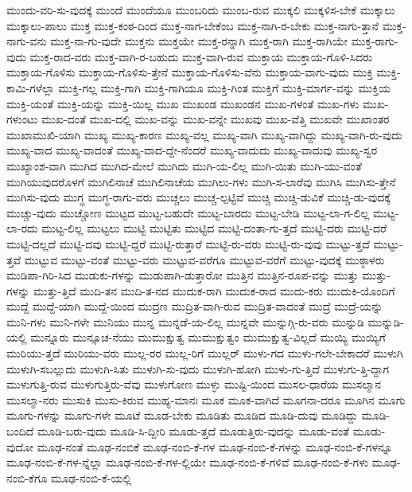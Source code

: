 {ಮುಂದು-ವರಿ-ಸು-ವುದಕ್ಕೆ
ಮುಂದೆ
ಮುಂದೆಯೂ
ಮುಂಬರಿದು
ಮುಂಬ-ರುವ
ಮುಕ್ಕಲಿ
ಮುಕ್ಕಳಿಸ-ಬೇಕೆ
ಮುಕ್ಕಾಲು
ಮುಕ್ಕಾಲು-ಪಾಲು
ಮುಕ್ತ
ಮುಕ್ತ-ಕಂಠ-ದಿಂದ
ಮುಕ್ತ-ನಾಗ-ಬೇಕೆಂಬ
ಮುಕ್ತ-ನಾಗಿ-ರ-ಬೇಕು
ಮುಕ್ತ-ನಾಗು-ತ್ತಾನೆ
ಮುಕ್ತ-ನಾಗು-ವನು
ಮುಕ್ತ-ನಾ-ಗು-ವುದೇ
ಮುಕ್ತನು
ಮುಕ್ತಯೇ
ಮುಕ್ತ-ರನ್ನಾಗಿ
ಮುಕ್ತ-ರಾಗಿ
ಮುಕ್ತ-ರಾಗಿಯೇ
ಮುಕ್ತ-ರಾಗು-ವುದು
ಮುಕ್ತ-ರಾದ-ವರು
ಮುಕ್ತ-ವಾಗಿ-ರ-ಬಹುದು
ಮುಕ್ತ-ವಾಗಿ-ರುವ
ಮುಕ್ತಾಯ
ಮುಕ್ತಾಯ-ಗೊಳಿ-ಸಿದರು
ಮುಕ್ತಾಯ-ಗೊಳಿಸು
ಮುಕ್ತಾಯ-ಗೊಳಿಸು-ತ್ತೇನೆ
ಮುಕ್ತಾಯ-ಗೊಳಿಸು-ವೆನು
ಮುಕ್ತಾಯ-ವಾಗು-ವುದು
ಮುಕ್ತಿ
ಮುಕ್ತಿ-ಕಾಮಿ-ಗಳೆಲ್ಲಾ
ಮುಕ್ತಿ-ಗಲ್ಲ
ಮುಕ್ತಿ-ಗಾಗಿ
ಮುಕ್ತಿ-ಗಾಗಿಯೂ
ಮುಕ್ತಿ-ಗಿಂತ
ಮುಕ್ತಿಗೆ
ಮುಕ್ತಿ-ಮಾರ್ಗ-ವನ್ನು
ಮುಕ್ತಿಯ
ಮುಕ್ತಿ-ಯಂತೆ
ಮುಕ್ತಿ-ಯನ್ನು
ಮುಕ್ತಿ-ಯಿಲ್ಲ
ಮುಖ
ಮುಖಂಡ
ಮುಖಂಡನ
ಮುಖ-ಗಳಂತೆ
ಮುಖ-ಗಳು
ಮುಖ-ಗಳುಂಟು
ಮುಖ-ದಂತೆ
ಮುಖ-ದಲ್ಲಿ
ಮುಖ-ವನ್ನು
ಮುಖ-ವನ್ನೇ
ಮುಖವು
ಮುಖ-ವೆತ್ತಿ
ಮುಖವೇ
ಮುಖಾಂತರ
ಮುಖಾಮುಖಿ-ಯಾಗಿ
ಮುಖ್ಯ
ಮುಖ್ಯ-ಕಾರಣ
ಮುಖ್ಯ-ವಲ್ಲ
ಮುಖ್ಯ-ವಾಗಿ
ಮುಖ್ಯ-ವಾಗಿದ್ದು
ಮುಖ್ಯ-ವಾಗಿ-ರು-ವುದು
ಮುಖ್ಯ-ವಾದ
ಮುಖ್ಯ-ವಾದಂತೆ
ಮುಖ್ಯ-ವಾದ-ದ್ದೇ-ನೆಂದರೆ
ಮುಖ್ಯ-ವಾದುದು
ಮುಖ್ಯ-ವಾದುವು
ಮುಖ್ಯ-ಸ್ವರ
ಮುಖ್ಯಾಂಶ-ವಾಗಿ
ಮುಗಿದ
ಮುಗಿದ-ಮೇಲೆ
ಮುಗಿದು
ಮುಗಿ-ಯ-ಲಿಲ್ಲ
ಮುಗಿ-ಯಿತು
ಮುಗಿ-ಯು-ವಂತೆ
ಮುಗಿಯುವುದರೊಳಗೆ
ಮುಗಿಲಿನಾಚೆ
ಮುಗಿಲಿನಾಚೆಯ
ಮುಗಿಲು-ಗಳು
ಮುಗಿ-ಸ-ಲಾರೆವು
ಮುಗಿಸಿ
ಮುಗಿಸು-ತ್ತೇನೆ
ಮುಗಿಸು-ವುದು
ಮುಗ್ಧ
ಮುಗ್ಧ-ರಾಗು-ವರು
ಮುಚ್ಚಲು
ಮುಚ್ಚ-ಲ್ಪಟ್ಟಿವೆ
ಮುಚ್ಚಿ
ಮುಚ್ಚಿ-ಡುವಿಕೆ
ಮುಚ್ಚಿ-ಡು-ವುದಕ್ಕೆ
ಮುಚ್ಚು-ವುದು
ಮುಚ್ಚೋಣ
ಮುಟ್ಟದ
ಮುಟ್ಟ-ಬಹುದೇ
ಮುಟ್ಟ-ಬಾರದು
ಮುಟ್ಟ-ಬೇಡಿ
ಮುಟ್ಟ-ಲಾ-ಗ-ಲಿಲ್ಲ
ಮುಟ್ಟ-ಲಾ-ರದು
ಮುಟ್ಟ-ಲಿಲ್ಲ
ಮುಟ್ಟಲು
ಮುಟ್ಟಿ
ಮುಟ್ಟಿತು
ಮುಟ್ಟಿದ
ಮುಟ್ಟಿ-ದಂತಾ-ಗು-ತ್ತದೆ
ಮುಟ್ಟಿ-ದರು
ಮುಟ್ಟಿ-ದರೆ
ಮುಟ್ಟಿ-ದಲ್ಲದೆ
ಮುಟ್ಟಿ-ದವು
ಮುಟ್ಟಿ-ದ್ದರೆ
ಮುಟ್ಟಿ-ರುತ್ತಾರೆ
ಮುಟ್ಟಿ-ರು-ವರು
ಮುಟ್ಟಿ-ರು-ವುವು
ಮುಟ್ಟು-ತ್ತದೆ
ಮುಟ್ಟು-ತ್ತವೆ
ಮುಟ್ಟುವ
ಮುಟ್ಟು-ವಂತೆ
ಮುಟ್ಟು-ವರು
ಮುಟ್ಟುವ-ವರೆಗೂ
ಮುಟ್ಟುವ-ವರೆಗೆ
ಮುಟ್ಟು-ವುದಕ್ಕೆ
ಮುಠ್ಠಾಳರು
ಮುಡಿಪಾ-ಗಿರಿ-ಸಿದ
ಮುಡುಕು-ಗಳನ್ನು
ಮುಡುಪಾಗಿ-ಡುತ್ತಾರೋ
ಮುತ್ತಿನ
ಮುತ್ತಿನ-ರೂಪ-ವನ್ನು
ಮುತ್ತು
ಮುತ್ತು-ಗಳನ್ನು
ಮುತ್ತು-ತ್ತಿದೆ
ಮುದಿ-ತನ
ಮುದಿ-ತ-ನದ
ಮುದುಕ-ರಾಗಿ
ಮುದುಕ-ರಾದ
ಮುದು-ಕರು
ಮುದುಕಿ-ಯೊಂದಿಗೆ
ಮುದ್ದೆ
ಮುದ್ದೆ-ಯಾಗಿ
ಮುದ್ದೆ-ಯಿಂದ
ಮುದ್ರಣ
ಮುದ್ರಿತ-ವಾಗಿ-ರುವ
ಮುದ್ರಿತ-ವಾದಂತೆ
ಮುದ್ರೆ
ಮುದ್ರೆ-ಯನ್ನು
ಮುನಿ-ಗಳು
ಮುನಿ-ಗಳೇ
ಮುನಿಯು
ಮುನ್ನ
ಮುನ್ನಡೆ-ಯ-ಲಿಲ್ಲ
ಮುನ್ನವೇ
ಮುನ್ನುಗ್ಗಿ-ರು-ವರು
ಮುನ್ನುಡಿ
ಮುನ್ನುಡಿ-ಯಲ್ಲಿ
ಮುನ್ನೂರು
ಮುನ್ಸೂಚ-ನೆಯು
ಮುಮುಕ್ಷುತ್ವ
ಮುಮುಕ್ಷುತ್ವಂ
ಮುಮುಕ್ಷುತ್ವ-ವಿಲ್ಲದೆ
ಮುಯ್ಯಿ
ಮುಯ್ಯಿಗೆ
ಮುರಿಯು-ತ್ತದೆ
ಮುರಿಯು-ವರು
ಮುಲ್ಲ-ರರ
ಮುಲ್ಲ-ರಿಗೆ
ಮುಲ್ಲರ್
ಮುಳು-ಗದ
ಮುಳು-ಗಲೇ-ಬೇಕಾದರೆ
ಮುಳುಗಿ
ಮುಳುಗಿ-ಸಬಲ್ಲುದು
ಮುಳುಗಿ-ಸಿತು
ಮುಳುಗಿ-ಸು-ವುದು
ಮುಳುಗಿ-ಹೋಗಿ
ಮುಳು-ಗು-ತ್ತಿದೆ
ಮುಳುಗು-ತ್ತಿ-ದ್ದಾಗ
ಮುಳುಗುತ್ತಿ-ರುವ
ಮುಳುಗುತ್ತಿರು-ವೆವು
ಮುಳುಗೋಣ
ಮುಳ್ಳು
ಮುಷ್ಟಿ-ಯಿಂದ
ಮುಸಲ-ಧಾರೆಯ
ಮುಸಲ್ಮಾನ
ಮುಸಲ್ಮಾ-ನರು
ಮುಸುಕಿ
ಮುಸು-ಕಿರುವ
ಮುಹ್ಯ-ಮಾನಃ
ಮೂಕ
ಮೂಕ-ವಾಗಿದೆ
ಮೂಗನಾ-ದರೂ
ಮೂಗಿನ
ಮೂಗು
ಮೂಗು-ಗಳನ್ನು
ಮೂಗು-ಗಳೇ
ಮೂಟೆ
ಮೂಡ-ಬೇಕು
ಮೂಡಿತು
ಮೂಡಿದ
ಮೂಡಿ-ದುವು
ಮೂಡಿದ್ದು
ಮೂಡಿ-ಬಂದಿದೆ
ಮೂಡಿ-ಬರು-ವುದು
ಮೂಡಿ-ಸಿ-ದ್ದೀರಿ
ಮೂಡು-ತ್ತದೆ
ಮೂಡುತ್ತಿರು-ವುದನ್ನು
ಮೂಡು-ವಂತೆ
ಮೂಡು-ವುದೋ
ಮೂಢ-ನಂತೆ
ಮೂಢ-ನಂಬಿಕೆ
ಮೂಢ-ನಂಬಿ-ಕೆ-ಗಳ
ಮೂಢ-ನಂಬಿ-ಕೆ-ಗಳನ್ನು
ಮೂಢ-ನಂಬಿ-ಕೆ-ಗಳನ್ನೂ
ಮೂಢ-ನಂಬಿ-ಕೆ-ಗಳ-ನ್ನೆಲ್ಲಾ
ಮೂಢ-ನಂಬಿ-ಕೆ-ಗಳ-ಲ್ಲಿಯೇ
ಮೂಢ-ನಂಬಿ-ಕೆ-ಗಳಿವೆ
ಮೂಢ-ನಂಬಿ-ಕೆ-ಗಳು
ಮೂಢ-ನಂಬಿ-ಕೆಗೂ
ಮೂಢ-ನಂಬಿ-ಕೆ-ಯಲ್ಲಿ
}
